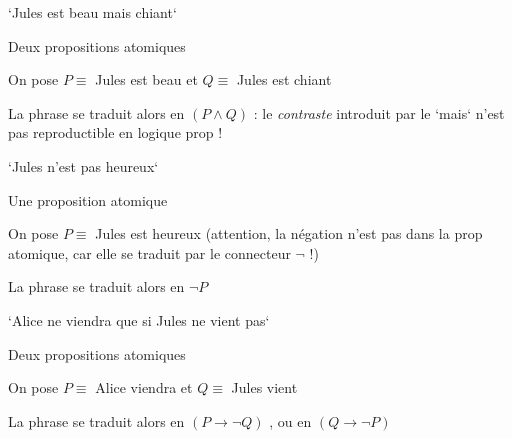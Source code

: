 
\begin{frame}

`Jules est beau mais chiant`\pause\newline

Deux propositions atomiques\pause\newline

On pose $P \equiv $ Jules est beau et $Q \equiv $ Jules est chiant\pause\newline

La phrase se traduit alors en \pause $(P \wedge Q)$ : le \textit{contraste} introduit par le `mais` n'est pas reproductible en logique prop !

\end{frame}


\begin{frame}

`Jules n'est pas heureux`\pause\newline

Une proposition atomique\pause\newline

On pose $P \equiv $ Jules est heureux (attention, la négation n'est pas dans la prop atomique, car elle se traduit par le connecteur $\neg$ !)\pause\newline

La phrase se traduit alors en $\neg P$

\end{frame}


\begin{frame}

`Alice ne viendra que si Jules ne vient pas`\pause\newline

Deux propositions atomiques\pause\newline

On pose $P \equiv $ Alice viendra et $Q \equiv $ Jules vient\pause\newline

La phrase se traduit alors en \pause $(P \rightarrow \neg Q)$ \pause, ou en $(Q \rightarrow \neg P)$

\end{frame}

